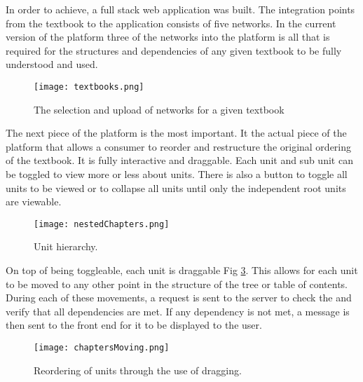 In order to achieve, a full stack web application was built. The integration points from the textbook to the application consists of five networks. In the current version of the platform three of the networks into the platform is all that is required for the structures and dependencies of any given textbook to be fully understood and used.

\begin{figure}[ht]
    \centering
    \texttt{[image: textbooks.png]}
    \caption[Textbook selection.]{The selection and upload of networks for a given textbook}
        
    \label{fig:textbooks}
\end{figure}

The next piece of the platform is the most important. It the actual piece of the platform that allows a consumer to reorder and restructure the original ordering of the textbook. It is fully interactive and draggable. Each unit and sub unit can be toggled to view more or less about units. There is also a button to toggle all units to be viewed or to collapse all units until only the independent root units are viewable.

\begin{figure}[ht]
    \centering
    \texttt{[image: nestedChapters.png]}
    \caption[Unit hierarchy.]{Unit hierarchy.}
        
    \label{fig:nestedChapters}
\end{figure}

\pagebreak

On top of being toggleable, each unit is draggable Fig \ref{fig:chaptersMoving}. This allows for each unit to be moved to any other point in the structure of the tree or table of contents. During each of these movements, a request is sent to the server to check the and verify that all dependencies are met. If any dependency is not met, a message is then sent to the front end for it to be displayed to the user.

\begin{figure}[ht]
    \centering
    \texttt{[image: chaptersMoving.png]}
    \caption[Reordering units.]{Reordering of units through the use of dragging.}
        
    \label{fig:chaptersMoving}
\end{figure}

\pagebreak
